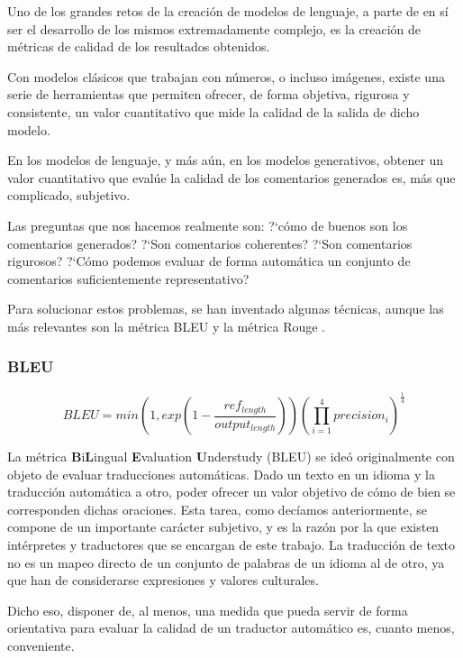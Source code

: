 Uno de los grandes retos de la creación de modelos de lenguaje, a parte de en sí ser el desarrollo de los mismos extremadamente complejo, es la creación de métricas de calidad de los resultados obtenidos.

Con modelos clásicos que trabajan con números, o incluso imágenes, existe una serie de herramientas que permiten ofrecer, de forma objetiva, rigurosa y consistente, un valor cuantitativo que mide la calidad de la salida de dicho modelo.

En los modelos de lenguaje, y más aún, en los modelos generativos, obtener un valor cuantitativo que evalúe la calidad de los comentarios generados es, más que complicado, subjetivo.

Las preguntas que nos hacemos realmente son: ?`cómo de buenos son los comentarios generados? ?`Son comentarios coherentes? ?`Son comentarios rigurosos? ?`Cómo podemos evaluar de forma automática un conjunto de comentarios suficientemente representativo?

Para solucionar estos problemas, se han inventado algunas técnicas, aunque las más relevantes son la métrica BLEU \cite{BLEU} y la métrica Rouge \cite{lin2004rouge}.

\subsubsection{BLEU}

\begin{equation}
	BLEU = min\left( 1, exp\left( 1 - \frac{ref_{length}}{output_{length}} \right) \right) \left( \prod^{4}_{i=1} precision_i \right)^{\frac{1}{4}}
\end{equation}

La métrica \textbf{B}i\textbf{L}ingual \textbf{E}valuation \textbf{U}nderstudy (BLEU) se ideó originalmente con objeto de evaluar traducciones automáticas. Dado un texto en un idioma y la traducción automática a otro, poder ofrecer un valor objetivo de cómo de bien se corresponden dichas oraciones. Esta tarea, como decíamos anteriormente, se compone de un importante carácter subjetivo, y es la razón por la que existen intérpretes y traductores que se encargan de este trabajo. La traducción de texto no es un mapeo directo de un conjunto de palabras de un idioma al de otro, ya que han de considerarse expresiones y valores culturales.

Dicho eso, disponer de, al menos, una medida que pueda servir de forma orientativa para evaluar la calidad de un traductor automático es, cuanto menos, conveniente.

